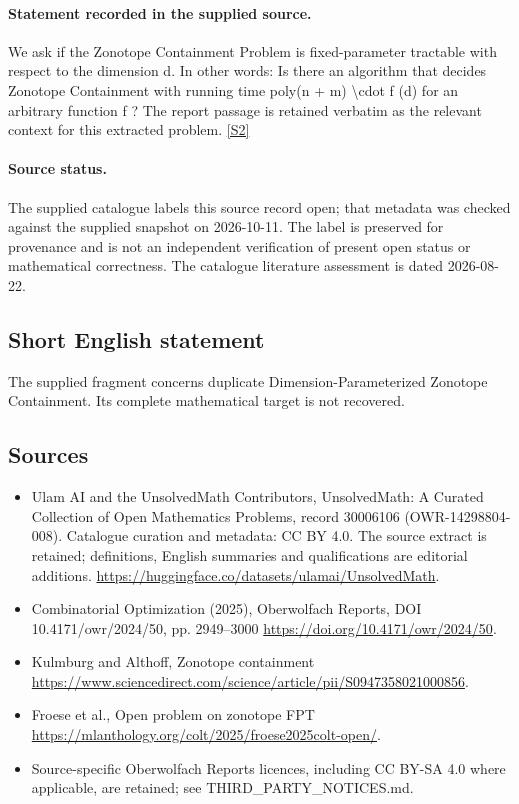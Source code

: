 \documentclass[11pt]{article}
\newcommand{\sref}[2]{\hyperlink{source:#1:#2}{[S#2]}}
\begin{document}
\paragraph{Statement recorded in the supplied source.}
We ask if the Zonotope Containment Problem is fixed-parameter tractable with respect to the dimension d. In other words: Is there an algorithm that decides Zonotope Containment with running time poly(n + m) \textbackslash{}cdot f (d) for an arbitrary function f ? The report passage is retained verbatim as the relevant context for this extracted problem. \sref{30006106}{2}
\paragraph{Source status.}
The supplied catalogue labels this source record open; that metadata was checked against the supplied snapshot on 2026-10-11. The label is preserved for provenance and is not an independent verification of present open status or mathematical correctness. The catalogue literature assessment is dated 2026-08-22.
\subsection{Short English statement}
The supplied fragment concerns duplicate Dimension-Parameterized Zonotope Containment. Its complete mathematical target is not recovered.
\subsection{Sources}
\begin{itemize}
\item[\hypertarget{source:30006106:1}{S1}] Ulam AI and the UnsolvedMath Contributors, UnsolvedMath: A Curated Collection of Open Mathematics Problems, record 30006106 (OWR-14298804-008). Catalogue curation and metadata: CC BY 4.0. The source extract is retained; definitions, English summaries and qualifications are editorial additions.
\url{https://huggingface.co/datasets/ulamai/UnsolvedMath}.
\item[\hypertarget{source:30006106:2}{S2}] Combinatorial Optimization (2025), Oberwolfach Reports, DOI 10.4171/owr/2024/50, pp. 2949--3000
\url{https://doi.org/10.4171/owr/2024/50}.
\item[\hypertarget{source:30006106:3}{S3}] Kulmburg and Althoff, Zonotope containment
\url{https://www.sciencedirect.com/science/article/pii/S0947358021000856}.
\item[\hypertarget{source:30006106:4}{S4}] Froese et al., Open problem on zonotope FPT
\url{https://mlanthology.org/colt/2025/froese2025colt-open/}.
\item Source-specific Oberwolfach Reports licences, including CC BY-SA 4.0 where applicable, are retained; see THIRD\_PARTY\_NOTICES.md.
\end{itemize}
\end{document}
